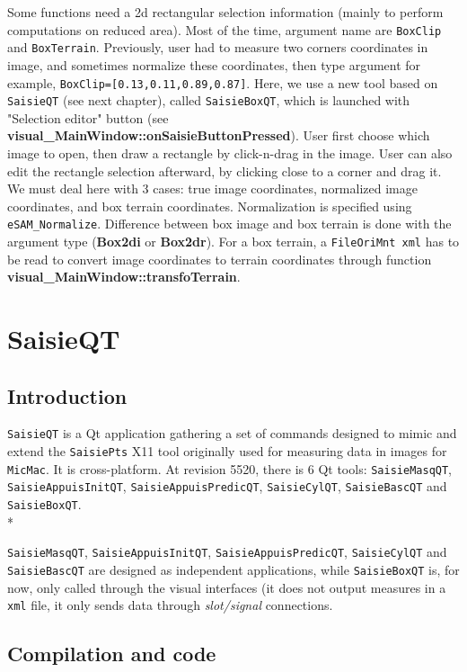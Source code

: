 Some functions need a 2d rectangular selection information (mainly to perform computations on reduced area). Most of the time, argument name are {\tt BoxClip} and {\tt BoxTerrain}. Previously, user had to measure two corners coordinates in image, and sometimes normalize these coordinates, then type argument for example, {\tt BoxClip=[0.13,0.11,0.89,0.87]}. Here, we use a new tool based on {\tt SaisieQT} (see next chapter), called {\tt SaisieBoxQT}, which is launched with "Selection editor" button (see \textbf{visual\_MainWindow::onSaisieButtonPressed}). User first choose which image to open, then draw a rectangle by click-n-drag in the image. User can also edit the rectangle selection afterward, by clicking close to a corner and drag it.
We must deal here with 3 cases: true image coordinates, normalized image coordinates, and box terrain coordinates.
Normalization is specified using {\tt eSAM\_Normalize}. Difference between box image and box terrain is done with the argument type (\textbf{Box2di} or \textbf{Box2dr}). For a box terrain, a {\tt FileOriMnt xml} has to be read to convert image coordinates to terrain coordinates through function \textbf{ visual\_MainWindow::transfoTerrain}.

\section{SaisieQT}

\subsection{Introduction}

{\tt SaisieQT} is a Qt application gathering a set of commands designed to mimic and extend the {\tt SaisiePts} X11 tool originally used for measuring data in images for {\tt MicMac}. It is cross-platform.
At revision 5520, there is 6 Qt tools: {\tt SaisieMasqQT}, {\tt SaisieAppuisInitQT}, {\tt SaisieAppuisPredicQT}, {\tt SaisieCylQT}, {\tt SaisieBascQT} and {\tt SaisieBoxQT}.\\*

{\tt SaisieMasqQT}, {\tt SaisieAppuisInitQT}, {\tt SaisieAppuisPredicQT}, {\tt SaisieCylQT} and {\tt SaisieBascQT} are designed as independent applications, while {\tt SaisieBoxQT} is, for now, only called through the visual interfaces (it does not output measures in a {\tt xml} file, it only sends data through \textit{slot/signal} connections.

\subsection{Compilation and code}

